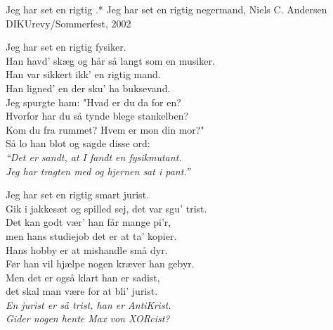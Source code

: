 \begin{song}{Jeg har set en rigtig .*}
  {} %
  {Jeg har set en rigtig negermand, Niels C. Andersen} %
  {} %
  {DIKUrevy/Sommerfest, 2002} %
  {\NotCCLIed} %

  \begin{SBVerse}
    Jeg har set en rigtig fysiker.\\
    Han havd’ skæg og hår så langt som en musiker.\\
    Han var sikkert ikk’ en rigtig mand.\\
    Han ligned’ en der sku’ ha buksevand.\\
    Jeg spurgte ham: "Hvad er du da for en?\\
    Hvorfor har du så tynde blege stankelben?\\
    Kom du fra rummet? Hvem er mon din mor?"\\
    Så lo han blot og sagde disse ord:\\
    \emph{``Det er sandt, at I fandt en fysikmutant.\\
    Jeg har tragten med og hjernen sat i pant.''}
  \end{SBVerse}

  \begin{SBVerse}
    Jeg har set en rigtig smart jurist.\\
    Gik i jakkesæt og spilled sej, det var sgu’ trist.\\
    Det kan godt vær’ han får mange pi’r,\\
    men hans studiejob det er at ta’ kopier.\\
    Hans hobby er at mishandle små dyr.\\
    Før han vil hjælpe nogen kræver han gebyr.\\
    Men det er også klart han er sadist,\\
    det skal man være for at bli’ jurist.\\
    \emph{En jurist er så trist, han er AntiKrist.\\
    Gider nogen hente Max von XORcist?}
  \end{SBVerse}


\end{song}
